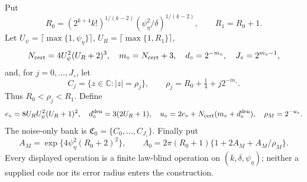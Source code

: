 Put
\[
 R_0=(2^{k+4}k!)^{1/(k-2)}
       (\psi_\eta^2/\delta)^{1/(k-2)},
 \qquad R_1=R_0+1.
\]
Let \(U_\psi=\lceil\max\{1,\psi_\eta\}\rceil\), \(U_R=\lceil\max\{1,R_1\}\rceil\),
\[
 N_{\rm cert}=4U_\psi^2(U_R+2)^3,
 \quad m_\circ=N_{\rm cert}+3,
 \quad d_\circ=2^{-m_\circ},
 \quad J_\circ=2^{m_\circ-1},
\]
and, for \(j=0,\ldots,J_\circ\), let
\[
 C_j=\{z\in\mathbb C:|z|=\rho_j\},
 \qquad \rho_j=R_0+\tfrac14+j2^{-m_\circ}.
\]
Thus \(R_0<\rho_j<R_1\). Define
\[
 e_\circ=8U_RU_\psi^2(U_R+1)^2,
 \quad d_\circ^{\rm den}=3(2U_R+1),
 \quad u_\circ=2e_\circ+N_{\rm cert}(m_\circ+d_\circ^{\rm den}),
 \quad \rho_M=2^{-u_\circ}.
\]
The noise-only bank is \(\mathfrak C_0=\{C_0,\ldots,C_{J_\circ}\}\). Finally put
\[
 A_M=\exp\{4\psi_\eta^2(R_0+2)^2\},
 \qquad
 \Lambda_0=2\pi(R_0+1)
 \{1+2A_M+A_M/\rho_M\}.
\]
Every displayed operation is a finite law-blind operation on \((k,\delta,\psi_\eta)\); neither a supplied code nor its error radius enters the construction.